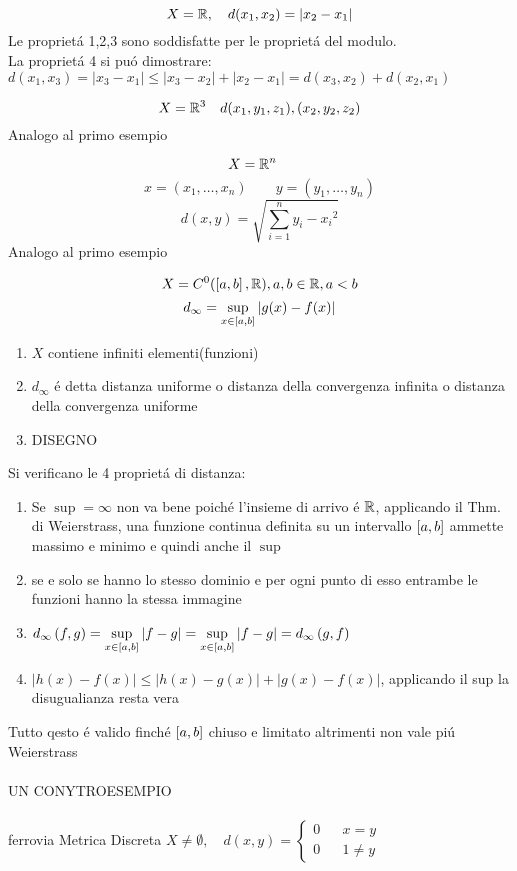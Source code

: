 \example
$$X=\bbset{R},\quad d(x_1,x_2)=\left| x_2-x_1 \right|$$
Le  propriet\'a 1,2,3 sono soddisfatte per le propriet\'a del modulo.\\
La propriet\'a 4 si pu\'o dimostrare: $d(x_1,x_3)=\left|x_3-x_1\right|\le\left|x_3-x_2\right|+\left|x_2-x_1\right|=d(x_3,x_2)+d(x_2,x_1)$

\example
$$X=\bbsetn{R}{3}\quad d({x_1,y_1,z_1),(x_2,y_2,z_2)}$$
Analogo al primo esempio

\example
$$X=\bbsetn{R}{n}\quad$$
$$x=(x_1,\ldots,x_n) \quad\quad y=(y_1,\ldots,y_n)$$
$$d(x,y)=\sqrt{\sum\limits_{i=1}^{n}{y_i-x_i}^2}$$
Analogo al primo esempio

\example
$$X=C^0(\realintervalclose{a}{b},\bbset{R}),a,b\in\bbset{R}, a<b$$
$$d_\infty=\sup\limits_{x\in\realintervalclose{a}{b}}\left|g(x)-f(x)\right|$$
\begin{enumerate}
	\item $X$ contiene infiniti elementi(funzioni)
	\item $d_\infty$ \'e detta distanza uniforme o distanza della convergenza infinita o distanza della convergenza uniforme
	\item DISEGNO
\end{enumerate}
Si verificano le 4 propriet\'a di distanza:
\begin{enumerate}
	\item Se $\sup = \infty$ non va bene poich\'e l'insieme di arrivo \'e $\bbset{R}$, applicando il Thm. di Weierstrass, una funzione continua definita su un intervallo $\realintervalclose{a}{b}$ ammette massimo e minimo e quindi anche il $\sup$
	\item se e solo se hanno lo stesso dominio e per ogni punto di esso entrambe le funzioni hanno la stessa immagine
	\item $\dinfty{f}{g}=\ddinfty{f}{g}{\realintervalclose{a}{b}}=\ddinfty{g}{f}{\realintervalclose{a}{b}}=\dinfty{g}{f}$
	\item $\left| h(x)-f(x) \right|\le\left|h(x)-g(x)\right|+\left|g(x)-f(x)\right| $, applicando il sup la disugualianza resta vera
\end{enumerate}
\observation 
Tutto qesto \'e valido finch\'e $\realintervalclose{a}{b}$ chiuso e limitato altrimenti non vale pi\'u Weierstrass \\
\\
UN CONYTROESEMPIO\\
\\
\example
ferrovia
\example
Metrica Discreta
$X\ne \emptyset,\quad d(x,y)= \left\{\begin{matrix}0&&x=y\\0&&1\ne y\end{matrix}\right.$
